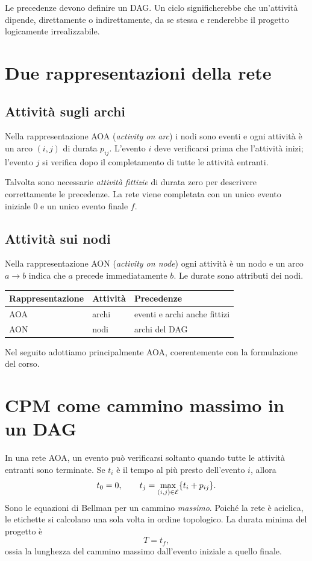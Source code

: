 \documentclass[11pt,a4paper]{article}
\begin{document}
Le precedenze devono definire un DAG. Un ciclo significherebbe che un'attività dipende, direttamente o indirettamente, da se stessa e renderebbe il progetto logicamente irrealizzabile.

\section{Due rappresentazioni della rete}
\subsection{Attività sugli archi}
Nella rappresentazione AOA (\emph{activity on arc}) i nodi sono eventi e ogni attività è un arco $(i,j)$ di durata $p_{ij}$. L'evento $i$ deve verificarsi prima che l'attività inizi; l'evento $j$ si verifica dopo il completamento di tutte le attività entranti.

Talvolta sono necessarie \emph{attività fittizie} di durata zero per descrivere correttamente le precedenze. La rete viene completata con un unico evento iniziale $0$ e un unico evento finale $f$.

\subsection{Attività sui nodi}
Nella rappresentazione AON (\emph{activity on node}) ogni attività è un nodo e un arco $a\to b$ indica che $a$ precede immediatamente $b$. Le durate sono attributi dei nodi.
\begin{center}\begin{tabular}{lll}\toprule Rappresentazione&Attività&Precedenze\\\midrule AOA&archi&eventi e archi anche fittizi\\ AON&nodi&archi del DAG\\\bottomrule\end{tabular}\end{center}
Nel seguito adottiamo principalmente AOA, coerentemente con la formulazione del corso.

\section{CPM come cammino massimo in un DAG}
In una rete AOA, un evento può verificarsi soltanto quando tutte le attività entranti sono terminate. Se $t_i$ è il tempo al più presto dell'evento $i$, allora
\begin{equation}\label{eq:forward}
t_0=0,\qquad t_j=\max_{(i,j)\in\mathcal{E}}\{t_i+p_{ij}\}.
\end{equation}
Sono le equazioni di Bellman per un cammino \emph{massimo}. Poiché la rete è aciclica, le etichette si calcolano una sola volta in ordine topologico. La durata minima del progetto è
\[T=t_f,\]
ossia la lunghezza del cammino massimo dall'evento iniziale a quello finale.
\end{document}
